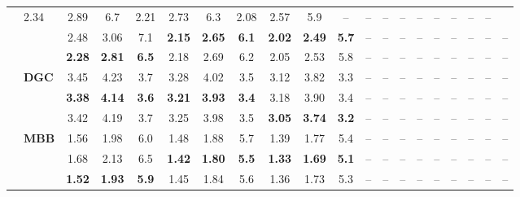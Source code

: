 \begin{table}[!t]
\begin{tabular*}{\textwidth}{@{\extracolsep{\fill}}llccc|ccc|ccc|ccc|ccc|ccc@{}}
  & 2.34 & 2.89 & 6.7 & 2.21 & 2.73 & 6.3 & 2.08 & 2.57 & 5.9
  & -- & -- & -- & -- & -- & -- & -- & -- & -- \\
& 
  & 2.48 & 3.06 & 7.1 & \textbf{2.15} & \textbf{2.65} & \textbf{6.1} & \textbf{2.02} & \textbf{2.49} & \textbf{5.7}
  & -- & -- & -- & -- & -- & -- & -- & -- & -- \\
& 
  & \textbf{2.28} & \textbf{2.81} & \textbf{6.5} & 2.18 & 2.69 & 6.2 & 2.05 & 2.53 & 5.8
  & -- & -- & -- & -- & -- & -- & -- & -- & -- \\
& \multirow{3}{*}{\textbf{DGC}} 
  & 3.45 & 4.23 & 3.7 & 3.28 & 4.02 & 3.5 & 3.12 & 3.82 & 3.3
  & -- & -- & -- & -- & -- & -- & -- & -- & -- \\
& 
  & \textbf{3.38} & \textbf{4.14} & \textbf{3.6} & \textbf{3.21} & \textbf{3.93} & \textbf{3.4} & 3.18 & 3.90 & 3.4
  & -- & -- & -- & -- & -- & -- & -- & -- & -- \\
& 
  & 3.42 & 4.19 & 3.7 & 3.25 & 3.98 & 3.5 & \textbf{3.05} & \textbf{3.74} & \textbf{3.2}
  & -- & -- & -- & -- & -- & -- & -- & -- & -- \\
& \multirow{3}{*}{\textbf{MBB}} 
  & 1.56 & 1.98 & 6.0 & 1.48 & 1.88 & 5.7 & 1.39 & 1.77 & 5.4
  & -- & -- & -- & -- & -- & -- & -- & -- & -- \\
& 
  & 1.68 & 2.13 & 6.5 & \textbf{1.42} & \textbf{1.80} & \textbf{5.5} & \textbf{1.33} & \textbf{1.69} & \textbf{5.1}
  & -- & -- & -- & -- & -- & -- & -- & -- & -- \\
& 
  & \textbf{1.52} & \textbf{1.93} & \textbf{5.9} & 1.45 & 1.84 & 5.6 & 1.36 & 1.73 & 5.3
  & -- & -- & -- & -- & -- & -- & -- & -- & -- \\
\midrule


\end{tabular*}
\end{table}
